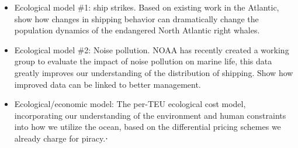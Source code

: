 \begin{itemize}
    \item Ecological model \#1: ship strikes. Based on existing work in the Atlantic, show how changes in shipping behavior can dramatically change the population dynamics of the endangered North Atlantic right whales.

    \item Ecological model \#2: Noise pollution. NOAA has recently created a working group to evaluate the impact of noise pollution on marine life, this data greatly improves our understanding of the distribution of shipping. Show how improved data can be linked to better management.

    \item Ecological/economic model: The per-TEU ecological cost model, incorporating our understanding of the environment and human constraints into how we utilize the ocean, based on the differential pricing schemes we already charge for piracy.⋅
\end{itemize}
